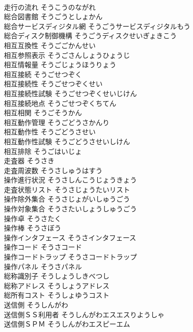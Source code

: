 \documentclass[8pt]{extreport}
\begin{document}
\begin{CJK}{UTF8}{min}
\\	走行の流れ	そうこうのながれ	
\\	総合図書館	そうごうとしょかん	
\\	総合サービスディジタル網	そうごうサービスディジタルもう	
\\	総合ディスク制御機構	そうごうディスクせいぎょきこう	
\\	相互互換性	そうごごかんせい	
\\	相互参照表示	そうごさんしょうひょうじ	
\\	相互情報量	そうごじょうほうりょう	
\\	相互接続	そうごせつぞく	
\\	相互接続性	そうごせつぞくせい	
\\	相互接続性試験	そうごせつぞくせいじけん	
\\	相互接続地点	そうごせつぞくちてん	
\\	相互相関	そうごそうかん	
\\	相互動作管理	そうごどうさかんり	
\\	相互動作性	そうごどうさせい	
\\	相互動作性試験	そうごどうさせいしけん	
\\	相互排除	そうごはいじょ	
\\	走査器	そうさき	
\\	走査周波数	そうさしゅうはすう	
\\	操作進行状況	そうさしんこうじょうきょう	
\\	走査状態リスト	そうさじょうたいリスト	
\\	操作除外集合	そうさじょがいしゅうごう	
\\	操作対象集合	そうさたいしょうしゅうごう	
\\	操作卓	そうさたく	
\\	操作棒	そうさぼう	
\\	操作インタフェース	そうさインタフェース	
\\	操作コード	そうさコード	
\\	操作コードトラップ	そうさコードトラップ	
\\	操作パネル	そうさパネル	
\\	総称識別子	そうしょうしきべつし	
\\	総称アドレス	そうしょうアドレス	
\\	総所有コスト	そうしょゆうコスト	
\\	送信側	そうしんがわ	
\\	送信側ＳＳ利用者	そうしんがわエスエスりようしゃ	
\\	送信側ＳＰＭ	そうしんがわエスピーエム	

\end{CJK}
\end{document}
